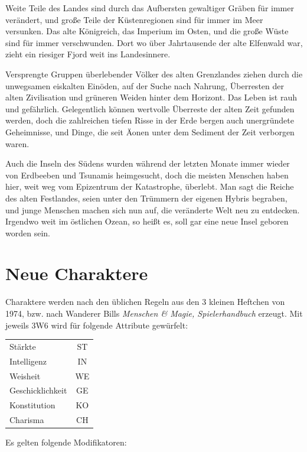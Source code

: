 \documentclass[11pt]{wbzine}
\begin{document}
\begin{multicols}{2}
Weite Teile des Landes sind durch das Aufbersten gewaltiger Gräben
für immer verändert, und große Teile der Küstenregionen sind für
immer im Meer versunken. Das alte Königreich, das Imperium im Osten,
und die große Wüste sind für immer verschwunden. Dort wo über
Jahrtausende der alte Elfenwald war, zieht ein riesiger Fjord weit
ins Landesinnere.

Versprengte Gruppen überlebender Völker des alten Grenzlandes ziehen
durch die unwegsamen eiskalten Einöden, auf der Suche nach Nahrung,
Überresten der alten Zivilisation und grüneren Weiden hinter dem
Horizont. Das Leben ist rauh und gefährlich. Gelegentlich können
wertvolle Überreste der alten Zeit gefunden werden, doch die
zahlreichen tiefen Risse in der Erde bergen auch unergründete
Geheimnisse, und Dinge, die seit Äonen unter dem Sediment
der Zeit verborgen waren.

Auch die Inseln des Südens wurden während der letzten Monate immer
wieder von Erdbeeben und Tsunamis heimgesucht, doch die meisten
Menschen haben hier, weit weg vom Epizentrum der Katastrophe,
überlebt. Man sagt die Reiche des alten Festlandes, seien unter den
Trümmern der eigenen Hybris begraben, und junge Menschen machen sich
nun auf, die veränderte Welt neu zu entdecken. Irgendwo weit im
östlichen Ozean, so heißt es, soll gar eine neue Insel geboren
worden sein.


\section{Neue Charaktere}

Charaktere werden nach den üblichen Regeln aus den 3 kleinen
Heftchen von 1974, bzw. nach Wanderer Bills \textit{Menschen \&
Magie, Spielerhandbuch} erzeugt. Mit jeweils 3W6 wird für folgende
Attribute gewürfelt: 

\begin{tabularx}{\columnwidth}{Zc}
    Stärkte & ST \\
    Intelligenz & IN \\
    Weisheit & WE \\
    Geschicklichkeit & GE \\
    Konstitution & KO \\
    Charisma & CH \\
\end{tabularx}

    Es gelten folgende Modifikatoren: 


\end{multicols}
\end{document}
